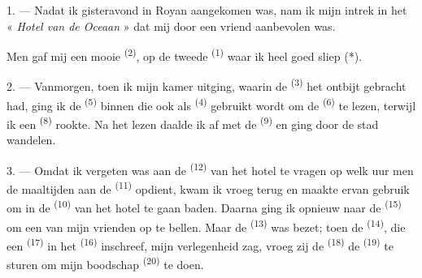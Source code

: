 %


\VUsaut{3.0mm}
\VUsaut{1.6mm}
\VUsaut{2.0mm}
\VUsaut{3.4mm}

1. --- Nadat ik gisteravond in Royan aangekomen was, nam ik mijn intrek in het « \textit{Hotel
van de Oceaan} » dat mij door een vriend aanbevolen was.

Men gaf mij een mooie  \textsuperscript{(2)}, op de tweede
 \textsuperscript{(1)} waar ik heel goed sliep (*).

2. --- Vanmorgen, toen ik mijn kamer uitging, waarin de 
\textsuperscript{(3)} het ontbijt gebracht had, ging ik de 
\textsuperscript{(5)} binnen die ook als  \textsuperscript{(4)} gebruikt
wordt om de  \textsuperscript{(6)} te lezen, terwijl ik een 
\textsuperscript{(8)} rookte. Na het lezen daalde ik af met de 
\textsuperscript{(9)} en ging door de stad wandelen.

3. --- Omdat ik vergeten was aan de  \textsuperscript{(12)} van het hotel te
vragen op welk uur men de maaltijden aan de 
\textsuperscript{(11)} opdient, kwam ik vroeg terug en maakte ervan gebruik om in de
 \textsuperscript{(10)} van het hotel te gaan baden. Daarna ging ik opnieuw
naar de  \textsuperscript{(15)} om een van mijn vrienden op te bellen. Maar de
 \textsuperscript{(13)} was bezet; toen de 
\textsuperscript{(14)}, die een  \textsuperscript{(17)} in het
 \textsuperscript{(16)} inschreef, mijn verlegenheid
zag, vroeg zij de  \textsuperscript{(18)} de 
\textsuperscript{(19)} te sturen om mijn boodschap  \textsuperscript{(20)}
te doen.

